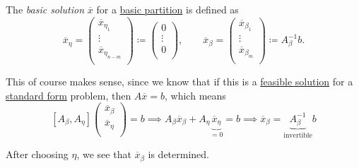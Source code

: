 \begin{definition}\label{def:basic-solution}
	The \emph{basic solution} \(\overline{x}\) for a \hyperref[def:basic-partition]{basic partition} is defined as
	\[
		\overline{x}_{\eta} = \begin{pmatrix}
			\overline{x}_{\eta_1}     \\
			\vdots                    \\
			\overline{x}_{\eta_{n-m}} \\
		\end{pmatrix}\coloneqq \begin{pmatrix}
			0      \\
			\vdots \\
			0      \\
		\end{pmatrix},\qquad \overline{x}_{\beta} = \begin{pmatrix}
			\overline{x}_{\beta_1} \\
			\vdots                 \\
			\overline{x}_{\beta_m} \\
		\end{pmatrix}\coloneqq A^{-1}_{\beta}b.
	\]
\end{definition}

\begin{intuition}
	This of course makes sense, since we know that if this is a \hyperref[def:feasible-solution]{feasible solution} for a \hyperref[def:standard-form]{standard form} problem,
	then \(A\overline{x} = b\), which means
	\[
		\left[ A_{\beta}, A_{\eta} \right] \begin{pmatrix}
			\overline{x}_{\beta} \\
			\overline{x}_{\eta}  \\
		\end{pmatrix} = b \implies A_{\beta}\overline{x}_{\beta} + A_{\eta}\underbrace{\overline{x}_{\eta}}_{=0} = b\implies \overline{x}_{\beta} = \underbrace{A^{-1}_{\beta}}_{\text{invertible}}b
	\]
\end{intuition}

\begin{remark}
	After choosing \(\eta\), we see that \(\overline{x}_{\beta}\) is determined.
\end{remark}